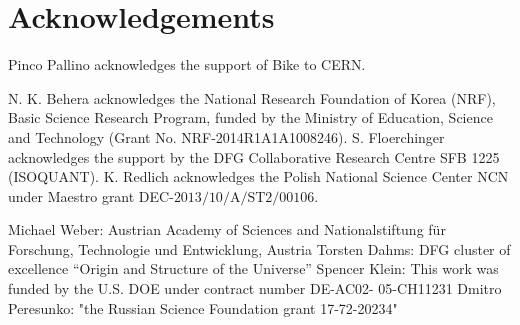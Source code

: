 \section*{Acknowledgements}


Pinco Pallino acknowledges the support of Bike to CERN.

N. K. Behera acknowledges the National Research Foundation of Korea (NRF), Basic Science Research Program, funded by the Ministry of Education, Science and Technology (Grant No. NRF-2014R1A1A1008246).
S. Floerchinger acknowledges the support by the DFG Collaborative Research Centre SFB 1225 (ISOQUANT). 
K. Redlich acknowledges the Polish National Science Center NCN under Maestro grant DEC-$\mathrm{2013/10/A/ST2/00106}$. 

Michael Weber: Austrian Academy of Sciences and Nationalstiftung f\"ur Forschung, Technologie und Entwicklung, Austria
Torsten Dahms: DFG cluster of excellence ``Origin and Structure of the Universe'' 
Spencer Klein: This work was funded by the U.S. DOE under contract number DE-AC02- 05-CH11231
Dmitro Peresunko: "the Russian Science Foundation grant 17-72-20234"

